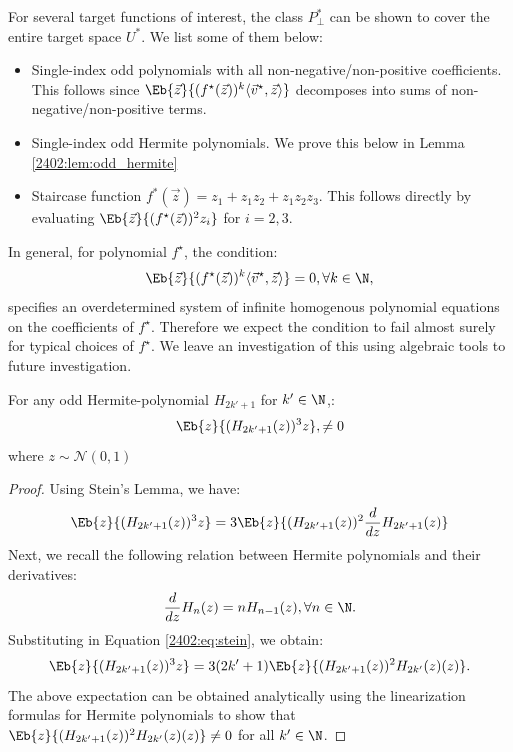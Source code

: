 For several target functions of interest, the class $P^*_\perp$ can be shown to cover the entire target space $U^*$. We list some of them below:
\begin{itemize}
    \item Single-index odd polynomials with all non-negative/non-positive coefficients. This follows since $\Eb{\vec{z}}{(f^\star(\vec{z}))^k\langle \vec{v}^\star, \vec{z}\rangle}$ decomposes into sums of  non-negative/non-positive terms.
    \item Single-index odd Hermite polynomials. We prove this below in Lemma \ref{2402:lem:odd_hermite}   
    \item Staircase function $f^*(\vec{z})=z_1+z_1z_2+z_1z_2z_3$. This follows directly by evaluating $\Eb{\vec{z}}{(f^\star(\vec{z}))^2z_i}$ for $i=2,3$.
\end{itemize}
 In general, for polynomial $f^\star$, the condition:
 \begin{equation}
     \Eb{\vec{z}}{(f^\star(\vec{z}))^k\langle \vec{v}^\star, \vec{z}\rangle} = 0, \forall k \in \N,
 \end{equation}
specifies an overdetermined system of infinite homogenous polynomial equations on the coefficients of $f^\star$. Therefore we expect the condition to fail almost surely for typical choices of $f^\star$. We leave an investigation of this using algebraic tools to future investigation.

\begin{lemma}\label{2402:lem:odd_hermite}
For any odd Hermite-polynomial $H_{2k'+1}$ for $k' \in \N$,:
\begin{equation}
    \Eb{z}{(H_{2k'+1}(z))^3z}, \neq 0
\end{equation}
where $z \sim \mathcal{N}(0,1)$
\end{lemma}

\begin{proof}
Using Stein's Lemma, we have:
\begin{equation}\label{2402:eq:stein}
    \Eb{z}{(H_{2k'+1}(z))^3z} = 3\Eb{z}{(H_{2k'+1}(z))^2  \frac{d}{dz}H_{2k'+1}(z)}
\end{equation}
Next, we recall the following relation between Hermite polynomials and their derivatives:
\begin{equation}
    \frac{d}{dz}H_{n}(z) = n H_{n-1}(z), \forall n \in \N.
\end{equation}
Substituting in Equation \eqref{2402:eq:stein}, we obtain:
\begin{equation}\label{2402:eq:stein2}
    \Eb{z}{(H_{2k'+1}(z))^3z} = 3(2k'+1)\Eb{z}{(H_{2k'+1}(z))^2 H_{2k'}(z)(z)}.
\end{equation}
The above expectation can be obtained analytically using the linearization formulas for Hermite polynomials \citep{andrews2004special} to show that $ \Eb{z}{(H_{2k'+1}(z))^2 H_{2k'}(z)(z)} \neq 0$ for all $k' \in \N$.
\end{proof}

